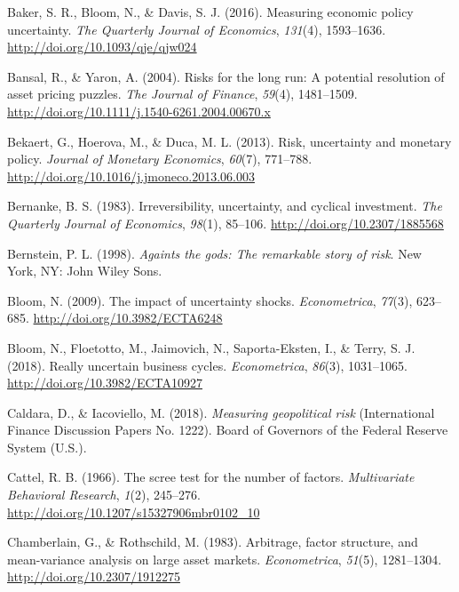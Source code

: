 \documentclass[12pt,twoside]{reedthesis}
\begin{document}
\leavevmode\hypertarget{ref-bakebloodavi:2016}{}%
Baker, S. R., Bloom, N., \& Davis, S. J. (2016). Measuring economic policy uncertainty. \emph{The Quarterly Journal of Economics}, \emph{131}(4), 1593--1636. \url{http://doi.org/10.1093/qje/qjw024}

\leavevmode\hypertarget{ref-bansyaro:2004}{}%
Bansal, R., \& Yaron, A. (2004). Risks for the long run: A potential resolution of asset pricing puzzles. \emph{The Journal of Finance}, \emph{59}(4), 1481--1509. \url{http://doi.org/10.1111/j.1540-6261.2004.00670.x}

\leavevmode\hypertarget{ref-bekahoerduca:2013}{}%
Bekaert, G., Hoerova, M., \& Duca, M. L. (2013). Risk, uncertainty and monetary policy. \emph{Journal of Monetary Economics}, \emph{60}(7), 771--788. \url{http://doi.org/10.1016/j.jmoneco.2013.06.003}

\leavevmode\hypertarget{ref-bernanke:1983}{}%
Bernanke, B. S. (1983). Irreversibility, uncertainty, and cyclical investment. \emph{The Quarterly Journal of Economics}, \emph{98}(1), 85--106. \url{http://doi.org/10.2307/1885568}

\leavevmode\hypertarget{ref-bernstein:1998}{}%
Bernstein, P. L. (1998). \emph{Againts the gods: The remarkable story of risk}. New York, NY: John Wiley Sons.

\leavevmode\hypertarget{ref-bloom:2009}{}%
Bloom, N. (2009). The impact of uncertainty shocks. \emph{Econometrica}, \emph{77}(3), 623--685. \url{http://doi.org/10.3982/ECTA6248}

\leavevmode\hypertarget{ref-bloofloejaimsapoterr:2018}{}%
Bloom, N., Floetotto, M., Jaimovich, N., Saporta-Eksten, I., \& Terry, S. J. (2018). Really uncertain business cycles. \emph{Econometrica}, \emph{86}(3), 1031--1065. \url{http://doi.org/10.3982/ECTA10927}

\leavevmode\hypertarget{ref-caldiaco:2018}{}%
Caldara, D., \& Iacoviello, M. (2018). \emph{Measuring geopolitical risk} (International Finance Discussion Papers No. 1222). Board of Governors of the Federal Reserve System (U.S.).

\leavevmode\hypertarget{ref-cattel:1966}{}%
Cattel, R. B. (1966). The scree test for the number of factors. \emph{Multivariate Behavioral Research}, \emph{1}(2), 245--276. \url{http://doi.org/10.1207/s15327906mbr0102_10}

\leavevmode\hypertarget{ref-chamroth:1983}{}%
Chamberlain, G., \& Rothschild, M. (1983). Arbitrage, factor structure, and mean-variance analysis on large asset markets. \emph{Econometrica}, \emph{51}(5), 1281--1304. \url{http://doi.org/10.2307/1912275}
\end{document}
